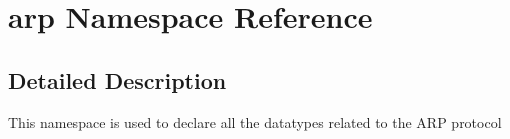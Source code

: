 \hypertarget{namespacearp}{}\section{arp Namespace Reference}
\label{namespacearp}


\subsection{Detailed Description}
This namespace is used to declare all the datatypes related to the A\+RP protocol 